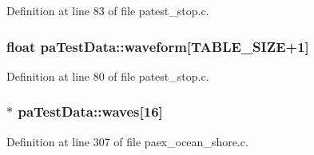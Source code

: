 Definition at line 83 of file patest\+\_\+stop.\+c.

\subsubsection[{\texorpdfstring{waveform}{waveform}}]{\setlength{\rightskip}{0pt plus 5cm}float pa\+Test\+Data\+::waveform\mbox{[}{\bf T\+A\+B\+L\+E\+\_\+\+S\+I\+ZE}+1\mbox{]}}\hypertarget{structpa_test_data_a6b32b75de182bd051bde0b48c7532ee7}{}\label{structpa_test_data_a6b32b75de182bd051bde0b48c7532ee7}


Definition at line 80 of file patest\+\_\+stop.\+c.

\subsubsection[{\texorpdfstring{waves}{waves}}]{$\ast$ pa\+Test\+Data\+::waves\mbox{[}16\mbox{]}}\hypertarget{structpa_test_data_a3329937562612094f827478bc793c441}{}\label{structpa_test_data_a3329937562612094f827478bc793c441}


Definition at line 307 of file paex\+\_\+ocean\+\_\+shore.\+c.



